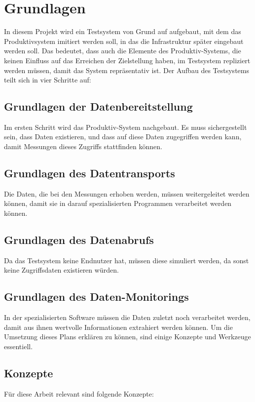 \section{Grundlagen}
In diesem Projekt wird ein Testsystem von Grund auf aufgebaut, mit dem das Produktivsystem imitiert werden soll, in das die Infrastruktur später eingebaut werden soll. Das bedeutet, dass auch die Elemente des Produktiv-Systems, die keinen Einfluss auf das Erreichen der Zielstellung haben, im Testsystem repliziert werden müssen, damit das System repräsentativ ist. \newline
Der Aufbau des Testsystems teilt sich in vier Schritte auf:
\subsection{Grundlagen der Datenbereitstellung}
Im ersten Schritt wird das Produktiv-System nachgebaut. Es muss sichergestellt sein, dass Daten existieren, und dass auf diese Daten zugegriffen werden kann, damit Messungen dieses Zugriffs stattfinden können.
\subsection{Grundlagen des Datentransports}
Die Daten, die bei den Messungen erhoben werden, müssen weitergeleitet werden können, damit sie in darauf spezialisierten Programmen verarbeitet werden können.
\subsection{Grundlagen des Datenabrufs}
Da das Testsystem keine Endnutzer hat, müssen diese simuliert werden, da sonst keine Zugriffsdaten existieren würden.
\subsection{Grundlagen des Daten-Monitorings}
In der spezialisierten Software müssen die Daten zuletzt noch verarbeitet werden, damit aus ihnen wertvolle Informationen extrahiert werden können.\newline
Um die Umsetzung dieses Plans erklären zu können, sind einige Konzepte und Werkzeuge essentiell.
\subsection {Konzepte} 
Für diese Arbeit relevant sind folgende Konzepte:
